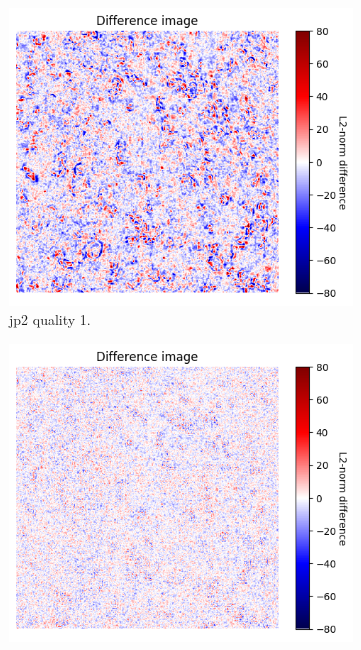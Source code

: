 \begin{figure}[htb]
    \centering
        \begin{subfigure}[b]{0.49\textwidth}
            \centering
            \includegraphics[width=\textwidth]{doc/thesis/0_figures/compare_quality/set1/heatmap/jp2_1_center_diff_heatmap.png}
            \caption{\gls{jp2} quality 1.}
            \label{fig:img_quality_center_heatmap_1}
        \end{subfigure}
        \begin{subfigure}[b]{0.49\textwidth}
            \centering
            \includegraphics[width=\textwidth]{doc/thesis/0_figures/compare_quality/set1/heatmap/jp2_5_center_diff_heatmap.png}

\end{subfigure}
\end{figure}
